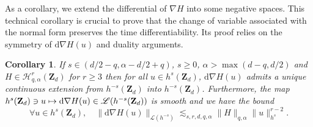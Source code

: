 \documentclass[JEP,XML,SOM,Unicode,NoEqCountersInSection,published]{cedram}
\newcommand\mto{\mathchoice{\longmapsto}{\mapsto}{\mapsto}{\mapsto}}
\newtheorem{corollary}[theorem]{Corollary}
\theoremstyle{definition}
\begin{document}
As a corollary, we extend the differential of $\nabla H$ into some negative spaces. This technical corollary is crucial to prove that the change of variable associated with the normal form preserves the time differentiability. Its proof relies on the symmetry of $\mathrm{d}\nabla H(u)$ and duality arguments.
\begin{corollary} \label{cor_extend} If $s\in (d/2-q, \alpha-d/2+q)$, $s\geq 0$, $\alpha >\max(d-q,d/2)$ and $ H\in \mathscr{H}_{q,\alpha}^r(\mathbf{Z}_d)$ for $r\geq 3$ then for all $u\in h^s(\mathbf{Z}_d)$, $\mathrm{d}\nabla H(u)$ admits a unique continuous extension from $h^{-s}(\mathbf{Z}_d)$ into $h^{-s}(\mathbf{Z}_d)$. Furthermore, the map $ h^s(\mathbf{Z}_d) \ni u \mto \mathrm{d}\nabla H(u) \in \mathscr{L}(h^{-s}(\mathbf{Z}_d))$ is smooth and we have the bound
\[
\forall u \in h^s(\mathbf{Z}_d), \quad \| \mathrm{d}\nabla H(u) \|_{\mathscr{L}(h^{-s})} \lesssim_{s,r,d,q,\alpha} \| H \|_{q,\alpha} \|u\|_{h^s}^{r-2}.
\]
\end{corollary}
\end{document}
